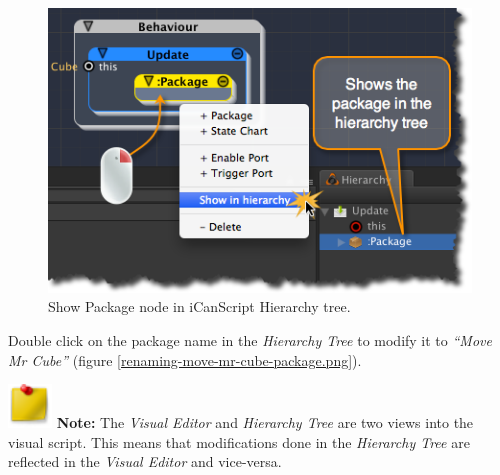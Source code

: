 \begin{figure}[htbp]
\centering
\includegraphics[keepaspectratio,width=\textwidth,height=0.75\textheight]{show-package-in-hierarchy.png}
\caption{Show Package node in iCanScript Hierarchy tree.}
\label{show-package-in-hierarchy.png}
\end{figure}

Double click on the package name in the \emph{Hierarchy Tree} to modify it to \emph{``Move Mr Cube''} (figure \ref{renaming-move-mr-cube-package.png}).
\begin{tipbox}

\includegraphics[width=33pt,height=33pt]{PostitNote_32x32.png} \textbf{Note:} The \emph{Visual Editor} and \emph{Hierarchy Tree} are two views into the visual script. This means that modifications done in the \emph{Hierarchy Tree} are reflected in the \emph{Visual Editor} and vice-versa.

\end{tipbox}



